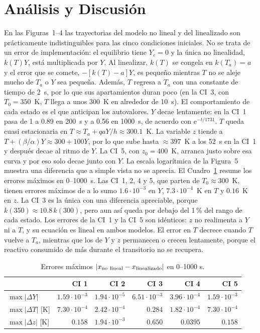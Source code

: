 \documentclass[11pt,a4paper]{article}
\newcommand{\e}{\mathrm{e}}
\begin{document}
\section{Análisis y Discusión}
En las Figuras~1--4 las trayectorias del modelo no lineal y del linealizado son prácticamente indistinguibles para las cinco condiciones iniciales. No se trata de un error de implementación: el equilibrio tiene $Y_e=0$ y la única no linealidad, $k(T)Y$, está multiplicada por $Y$. Al linealizar, $k(T)$ se congela en $k(T_a)=a$ y el error que se comete, $-[k(T)-a]Y$, es pequeño mientras $T$ no se aleje mucho de $T_a$ o $Y$ sea pequeña. Además, $T$ regresa a $T_a$ con una constante de tiempo de 2~s, por lo que sus apartamientos duran poco (en la CI~3, con $T_0=350$~K, $T$ llega a unos 300~K en alrededor de 10~s).
El comportamiento de cada estado es el que anticipan los autovalores. $Y$ decae lentamente: en la CI~1 pasa de 1 a 0.89 en 200~s y a 0.56 en 1000~s, de acuerdo con $\e^{-t/1731}$. $T$ queda cuasi estacionaria en $T\approx T_a+qaY/h\approx300.1$~K. La variable $z$ tiende a $T+(\beta/\alpha)Y\approx300+100Y$, por lo que sube hasta $\approx397$~K a los 52~s en la CI~1 y después decae al ritmo de $Y$. La CI~5, con $z_0=400$~K, arranca justo sobre esa curva y por eso solo decae junto con $Y$.
La escala logarítmica de la Figura~5 muestra una diferencia que a simple vista no se aprecia. El Cuadro~\ref{tab:err} resume los errores máximos en 0--1000~s. Las CI~1, 2, 4 y 5, que parten de $T_0\approx300$~K, tienen errores máximos de a lo sumo $1.6\cdot10^{-3}$ en $Y$, $7.3\cdot10^{-4}$~K en $T$ y $0.16$~K en $z$. La CI~3 es la única con una diferencia apreciable, porque $k(350)\approx10.8\,k(300)$, pero aun así queda por debajo del 1\,\% del rango de cada estado. Los errores de la CI~1 y la CI~5 son idénticos: $z$ no realimenta a $Y$ ni a $T$, y su ecuación es lineal en ambos modelos. El error en $T$ decrece cuando $T$ vuelve a $T_a$, mientras que los de $Y$ y $z$ permanecen o crecen lentamente, porque el reactivo consumido de más durante el transitorio no se recupera.
\begin{table}[H]\centering\caption{Errores máximos $|x_{\rm no\ lineal}-x_{\rm linealizado}|$ en 0--1000 s.}\label{tab:err}
\begin{tabular}{lrrrrr}\toprule
&CI 1&CI 2&CI 3&CI 4&CI 5\\\midrule
$\max|\Delta Y|$&$1.59\cdot10^{-3}$&$1.94\cdot10^{-5}$&$6.51\cdot10^{-3}$&$3.96\cdot10^{-4}$&$1.59\cdot10^{-3}$\\
$\max|\Delta T|$ [K]&$7.30\cdot10^{-4}$&$2.42\cdot10^{-4}$&$0.284$&$1.82\cdot10^{-4}$&$7.30\cdot10^{-4}$\\
$\max|\Delta z|$ [K]&$0.158$&$1.94\cdot10^{-3}$&$0.650$&$0.0395$&$0.158$\\\bottomrule
\end{tabular}\end{table}
\end{document}
